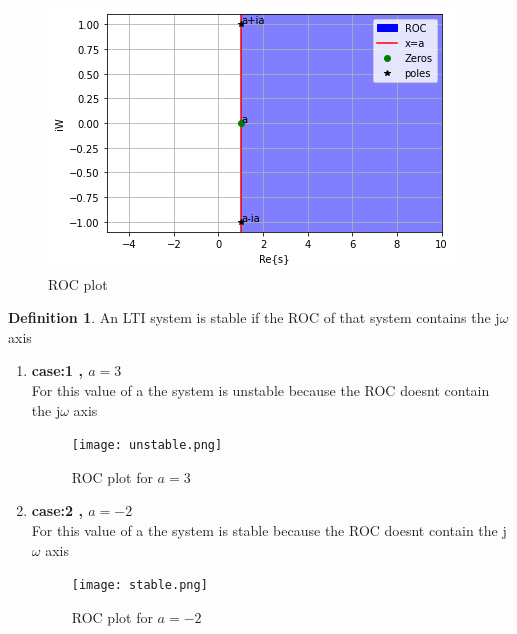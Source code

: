 \documentclass[journal,12pt,twocolumn]{IEEEtran}
\theoremstyle{plain}
\theoremstyle{definition}
\newtheorem{defn}{Definition}[section]
\theoremstyle{remark}
\begin{document}
\begin{figure}[htp]
    \centering
    \includegraphics[width = \columnwidth]{fig.png}
    \caption{ROC plot}
    \label{fig:my_label}
\end{figure}
\newpage
\begin{defn}
 An LTI system is stable if the ROC of that system contains
 the j$\omega$ axis
\end{defn}
\begin{enumerate}
    \item \textbf{case:1 , $a=3$}\\
    For this value of a the system is unstable because the ROC doesnt contain the j$\omega$ axis
    \begin{figure}[htp]
        \centering
        \texttt{[image: unstable.png]}
        \caption{ROC plot for $a=3$ }
        \label{fig:my_label}
    \end{figure}
    \item\textbf{case:2 , $a=-2$}\\
    For this value of a the system is stable because the ROC doesnt contain the j$\omega$ axis
     \begin{figure}[htp]
        \centering
        \texttt{[image: stable.png]}
        \caption{ROC plot for $a=-2$ }
        \label{fig:my_label}
    \end{figure}
\end{enumerate}
    
\end{document}
